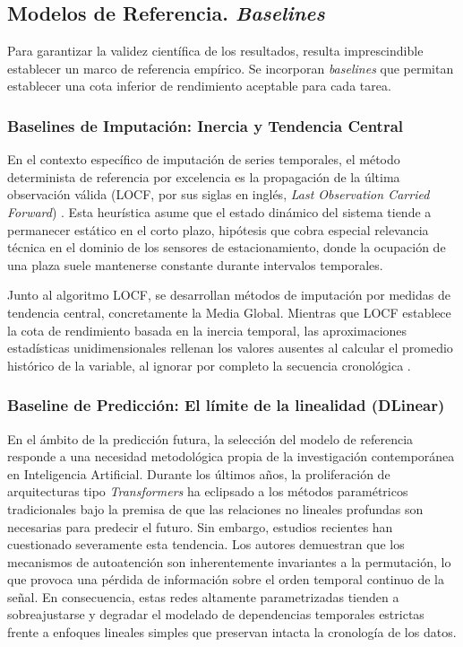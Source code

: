 \subsection{Modelos de Referencia. \textit{Baselines}}
\label{sec:baselines}

Para garantizar la validez científica de los resultados, resulta imprescindible establecer un marco de referencia empírico. Se incorporan \textit{baselines} que permitan establecer una cota inferior de rendimiento aceptable para cada tarea.

\subsubsection{Baselines de Imputación: Inercia y Tendencia Central}

En el contexto específico de imputación de series temporales, el método determinista de referencia por excelencia es la propagación de la última observación válida (LOCF, por sus siglas en inglés, \textit{Last Observation Carried Forward}) \parencite{little2019statistical}. Esta heurística asume que el estado dinámico del sistema tiende a permanecer estático en el corto plazo, hipótesis que cobra especial relevancia técnica en el dominio de los sensores de estacionamiento, donde la ocupación de una plaza suele mantenerse constante durante intervalos temporales. 

Junto al algoritmo LOCF, se desarrollan métodos de imputación por medidas de tendencia central, concretamente la Media Global. Mientras que LOCF establece la cota de rendimiento basada en la inercia temporal, las aproximaciones estadísticas unidimensionales rellenan los valores ausentes al calcular el promedio histórico de la variable, al ignorar por completo la secuencia cronológica \parencite{moritz2015imputeTS}.

\subsubsection{Baseline de Predicción: El límite de la linealidad (DLinear)}

En el ámbito de la predicción futura, la selección del modelo de referencia responde a una necesidad metodológica propia de la investigación contemporánea en Inteligencia Artificial. Durante los últimos años, la proliferación de arquitecturas tipo \textit{Transformers} ha eclipsado a los métodos paramétricos tradicionales bajo la premisa de que las relaciones no lineales profundas son necesarias para predecir el futuro. Sin embargo, estudios recientes \parencite{zeng2023are} han cuestionado severamente esta tendencia. Los autores demuestran que los mecanismos de autoatención son inherentemente invariantes a la permutación, lo que provoca una pérdida de información sobre el orden temporal continuo de la señal. En consecuencia, estas redes altamente parametrizadas tienden a sobreajustarse y degradar el modelado de dependencias temporales estrictas frente a enfoques lineales simples que preservan intacta la cronología de los datos.

